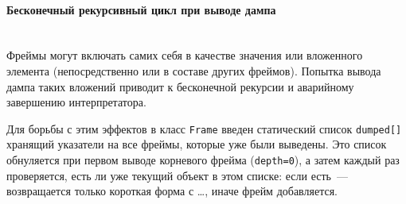 \paragraph{Бесконечный рекурсивный цикл при выводе дампа}\ \\

Фреймы могут включать самих себя в качестве значения или вложенного элемента
(непосредственно или в составе других фреймов). Попытка вывода дампа таких
вложений приводит к бесконечной рекурсии и аварийному завершению интерпретатора.

Для борьбы с этим эффектов в класс \verb|Frame| введен статический список
\verb|dumped[]| хранящий указатели на все фреймы, которые уже были выведены.
Это список обнуляется при первом выводе корневого фрейма (\verb|depth=0|), а
затем каждый раз проверяется, есть ли уже текущий объект в этом списке: если
есть\ --- возвращается только короткая форма с \ldots, иначе фрейм добавляется.

\clearpage
{}

